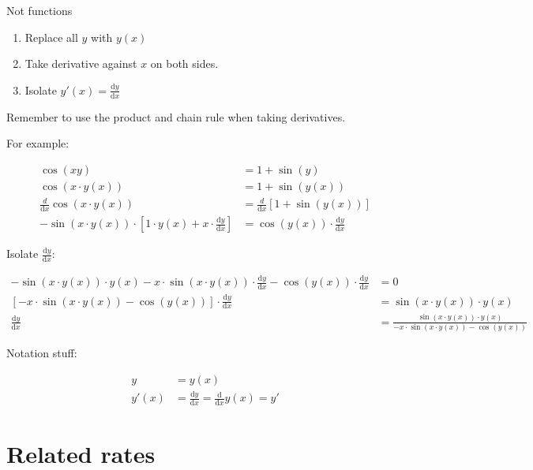 \documentclass[12pt]{article}
\theoremstyle{plain}
\theoremstyle{remark}
\theoremstyle{definition}
\begin{document}
Not functions

\begin{enumerate}
\def\labelenumi{\arabic{enumi}.}
\item
  Replace all \(y\) with \(y(x)\)
\item
  Take derivative against \(x\) on both sides.
\item
  Isolate \(y'(x) = \frac{\text{d}y}{\text{d}x}\)
\end{enumerate}

Remember to use the product and chain rule when taking derivatives.

For example:

\begin{align*}
\cos\left( xy \right) &= 1 + \sin(y) \\
\cos\left( x \cdot y(x) \right) &= 1 + \sin\left( y(x) \right) \\
\frac{d}{\text{d}x}\cos\left( x \cdot y(x) \right) &= \frac{d}{\text{d}x}\left\lbrack 1 + \sin\left( y(x) \right) \right\rbrack \\
- \sin\left( x \cdot y(x) \right) \cdot \left\lbrack 1 \cdot y(x) + x \cdot \frac{\text{d}y}{\text{d}x} \right\rbrack &= \cos\left( y(x) \right) \cdot \frac{\text{d}y}{\text{d}x}
\end{align*}


Isolate \(\frac{\text{d}y}{\text{d}x}\):

\begin{align*}
- \sin\left( x \cdot y(x) \right) \cdot y(x) - x \cdot \sin\left( x \cdot y(x) \right) \cdot \frac{\text{d}y}{\text{d}x} - \cos\left( y(x) \right) \cdot \frac{\text{d}y}{\text{d}x} &= 0 \\
\left\lbrack - x \cdot \sin\left( x \cdot y(x) \right) - \cos\left( y(x) \right) \right\rbrack \cdot \frac{\text{d}y}{\text{d}x} &= \sin\left( x \cdot y(x) \right) \cdot y(x) \\
\frac{\text{d}y}{\text{d}x} &= \frac{\sin\left( x \cdot y(x) \right) \cdot y(x)}{- x \cdot \sin\left( x \cdot y(x) \right) - \cos\left( y(x) \right)}
\end{align*}


Notation stuff:

\begin{align*}
y &= y(x) \\
y'(x) &= \frac{\text{d}y}{\text{d}x} = \frac{\text{d}}{\text{d}x}y(x) = y'
\end{align*}



\section{Related rates}
\end{document}

